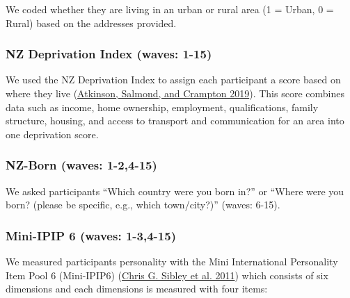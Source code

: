\documentclass[
  singlecolumn]{report}
\begin{document}
We coded whether they are living in an urban or rural area (1 = Urban, 0
= Rural) based on the addresses provided.

\hypertarget{nz-deprivation-index-waves-1-15}{%
\subsubsection{NZ Deprivation Index (waves:
1-15)}\label{nz-deprivation-index-waves-1-15}}

We used the NZ Deprivation Index to assign each participant a score
based on where they live (\protect\hyperlink{ref-atkinson2019}{Atkinson,
Salmond, and Crampton 2019}). This score combines data such as income,
home ownership, employment, qualifications, family structure, housing,
and access to transport and communication for an area into one
deprivation score.

\hypertarget{nz-born-waves-1-24-15}{%
\subsubsection{NZ-Born (waves: 1-2,4-15)}\label{nz-born-waves-1-24-15}}

We asked participants ``Which country were you born in?'' or ``Where
were you born? (please be specific, e.g., which town/city?)'' (waves:
6-15).

\hypertarget{mini-ipip-6-waves-1-34-15}{%
\subsubsection{Mini-IPIP 6 (waves:
1-3,4-15)}\label{mini-ipip-6-waves-1-34-15}}

We measured participants personality with the Mini International
Personality Item Pool 6 (Mini-IPIP6)
(\protect\hyperlink{ref-sibley2011}{Chris G. Sibley et al. 2011}) which
consists of six dimensions and each dimensions is measured with four
items:
\end{document}
